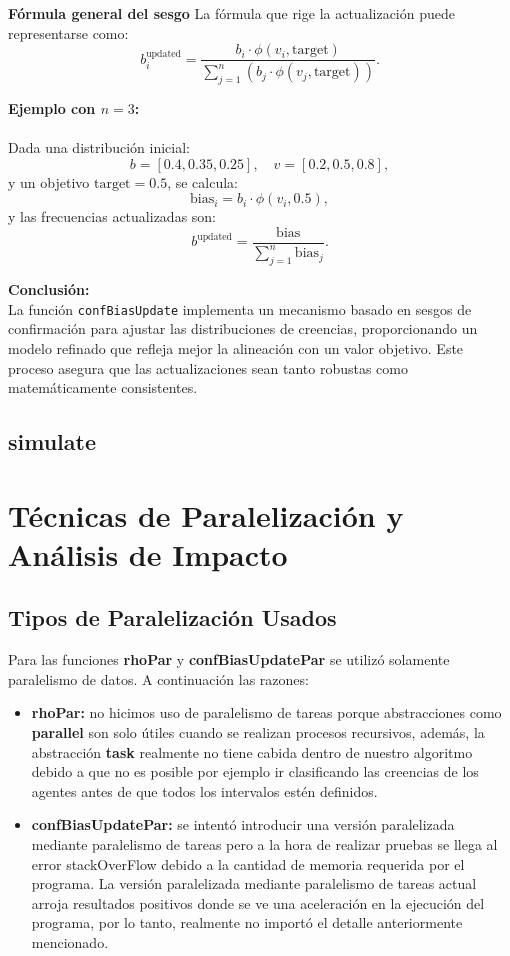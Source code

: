 \documentclass{article}
\begin{document}
	\textbf{Fórmula general del sesgo}
	La fórmula que rige la actualización puede representarse como:
	\[
	b_i^{\text{updated}} = \frac{b_i \cdot \phi(v_i, \text{target})}{\sum_{j=1}^n \left(b_j \cdot \phi(v_j, \text{target})\right)}.
	\]
	
	\textbf{Ejemplo con $n=3$:}\\\\
	Dada una distribución inicial:
	\[
	b = [0.4, 0.35, 0.25], \quad v = [0.2, 0.5, 0.8],
	\]
	y un objetivo $\text{target} = 0.5$, se calcula:
	\[
	\text{bias}_i = b_i \cdot \phi(v_i, 0.5),
	\]
	y las frecuencias actualizadas son:
	\[
	b^{\text{updated}} = \frac{\text{bias}}{\sum_{j=1}^n \text{bias}_j}.
	\]
	
	\textbf{Conclusión:}\\
	La función \texttt{confBiasUpdate} implementa un mecanismo basado en sesgos de confirmación para ajustar las distribuciones de creencias, proporcionando un modelo refinado que refleja mejor la alineación con un valor objetivo. Este proceso asegura que las actualizaciones sean tanto robustas como matemáticamente consistentes.



    \subsection{simulate}

  \section{Técnicas de Paralelización y Análisis de Impacto}

    \subsection{Tipos de Paralelización Usados}
    Para las funciones \textbf{rhoPar} y \textbf{confBiasUpdatePar} se utilizó solamente paralelismo de datos. A continuación  las razones:

    \begin{itemize}
      \item \textbf{rhoPar:} no hicimos uso de paralelismo de tareas porque abstracciones como \textbf{parallel} son solo útiles cuando se realizan procesos recursivos, además, la abstracción \textbf{task} realmente no tiene cabida dentro de nuestro algoritmo debido a que no es posible por ejemplo ir clasificando las creencias de los agentes antes de que todos los intervalos estén definidos.
      \item \textbf{confBiasUpdatePar:} se intentó introducir una versión paralelizada mediante paralelismo de tareas pero a la hora de realizar pruebas se llega al error stackOverFlow debido a la cantidad de memoria requerida por el programa. La versión paralelizada mediante paralelismo de tareas actual arroja resultados positivos donde se ve una aceleración en la ejecución del programa, por lo tanto, realmente no importó el detalle anteriormente mencionado.
    \end{itemize}
\end{document}
